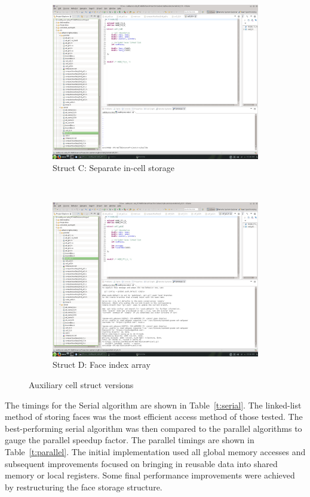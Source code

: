 \documentclass[]{aiaa-tc}%
\begin{document}
\begin{figure}
  \begin{subfigure}[b]{0.45\linewidth}
    \centering
    \includegraphics[trim=11.2cm 21.8cm 24cm 4.8cm,
    clip=true, width=0.7\linewidth]{figures/cells/cell_arrays}
    \caption{Struct C: Separate in-cell storage}
  \end{subfigure}
  ~
  \begin{subfigure}[b]{0.45\linewidth}
    \centering
    \includegraphics[trim=11.2cm 21.8cm 24cm 4.8cm,
    clip=true, width=0.7\linewidth]{figures/cells/cell_index}
    \caption{Struct D: Face index array}
  \end{subfigure}
  
  \caption{Auxiliary cell struct versions}
\end{figure}


The timings for the Serial algorithm are shown in
Table~\ref{t:serial}. The linked-list method of storing faces was the
most efficient access method of those tested. The best-performing
serial algorithm was then compared to the parallel algorithms to gauge
the parallel speedup factor. The parallel timings are shown in
Table~\ref{t:parallel}. The initial implementation used all global
memory accesses and subsequent improvements focused on bringing in
reusable data into shared memory or local registers. Some final
performance improvements were achieved by restructuring the face
storage structure.
\end{document}

